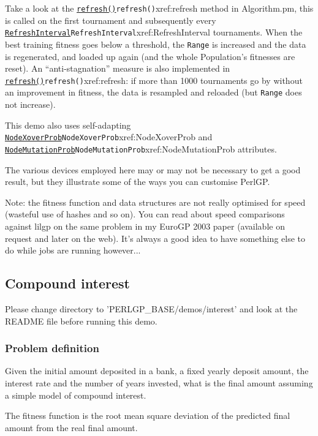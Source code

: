 \documentclass[a4paper]{article}
\begin{document}
Take a look at the \hyperref[no]{\texttt{refresh()}}{\texttt{refresh()}}{xref:refresh} method in Algorithm.pm, this is
called on the first tournament and subsequently every
\hyperref[no]{\texttt{RefreshInterval}}{\texttt{RefreshInterval}}{xref:RefreshInterval} tournaments.  When the best training fitness
goes below a threshold, the \texttt{Range} is increased and the data
is regenerated, and loaded up again (and the whole Population's
fitnesses are reset).  An ``anti-stagnation'' measure is also
implemented in \hyperref[no]{\texttt{refresh()}}{\texttt{refresh()}}{xref:refresh}: if more than 1000 tournaments go by
without an improvement in fitness, the data is resampled and reloaded
(but \texttt{Range} does not increase).

This demo also uses self-adapting \hyperref[no]{\texttt{NodeXoverProb}}{\texttt{NodeXoverProb}}{xref:NodeXoverProb} and
\hyperref[no]{\texttt{NodeMutationProb}}{\texttt{NodeMutationProb}}{xref:NodeMutationProb} attributes.

The various devices employed here may or may not be necessary to get a
good result, but they illustrate some of the ways you can customise
PerlGP.  

Note: the fitness function and data structures are not really
optimised for speed (wasteful use of hashes and so on).  You can read
about speed comparisons against lilgp on the same problem in my EuroGP
2003 paper (available on request and later on the web).  It's always a
good idea to have something else to do while jobs are running however...

\subsection{Compound interest}

Please change directory to 'PERLGP\_BASE/demos/interest' and look at the
README file before running this demo.

\subsubsection{Problem definition}

Given the initial amount deposited in a bank, a fixed yearly deposit
amount, the interest rate and the number of years invested, what is
the final amount assuming a simple model of compound interest.

The fitness function is the root mean square deviation of the
predicted final amount from the real final amount.
\end{document}
